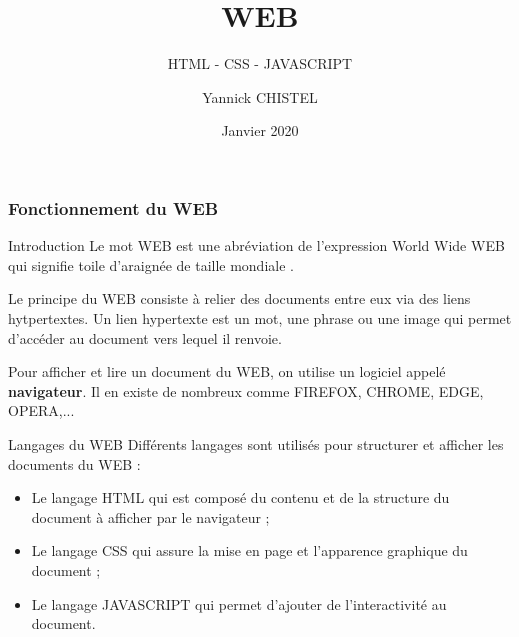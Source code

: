\documentclass[8pt]{beamer}
\title{WEB}
\subtitle{HTML - CSS - JAVASCRIPT}
\author{Yannick CHISTEL}
\institute{Lycée Dumont d'Urville - CAEN}
\date{Janvier 2020}
\begin{document}
 
\frame{\titlepage}

\begin{frame}
\frametitle{Fonctionnement du WEB}


\begin{block}{Introduction}
Le mot WEB est une abréviation de l'expression World Wide WEB qui signifie \og toile d'araignée de taille mondiale \fg.

Le principe du WEB consiste à relier des documents entre eux via des liens hytpertextes. Un lien hypertexte est un mot, une phrase ou une image qui permet d'accéder au document vers lequel il renvoie. 

Pour afficher et lire un document du WEB, on utilise un logiciel appelé \textbf{navigateur}. Il en existe de nombreux comme FIREFOX, CHROME, EDGE, OPERA,...
\end{block}

\begin{block}{Langages du WEB}
Différents langages sont utilisés pour structurer et afficher les documents du WEB :
\begin{itemize}
\item Le langage HTML qui est composé du contenu et de la structure du document à afficher par le navigateur ; 
\item Le langage CSS qui assure la mise en page et l'apparence graphique du document ;
\item Le langage JAVASCRIPT qui permet d'ajouter de l'interactivité au document.
\end{itemize}
\end{block}

\end{frame}
\end{document}
